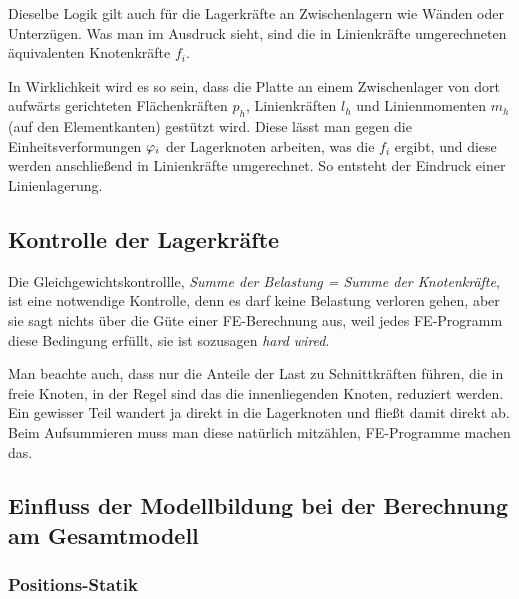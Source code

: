 Dieselbe Logik gilt auch f\"{u}r die Lagerkr\"{a}fte an Zwischenlagern wie W\"{a}nden oder Unterz\"{u}gen. Was man im Ausdruck sieht, sind die in Linienkr\"{a}fte umgerechneten \"{a}quivalenten Knotenkr\"{a}fte $f_i$.

In Wirklichkeit wird es so sein, dass die Platte an einem Zwischenlager von dort aufw\"{a}rts gerichteten Fl\"{a}chenkr\"{a}ften $p_h$, Linienkr\"{a}ften $l_h$ und Linienmomenten $m_h$ (auf den Elementkanten) gest\"{u}tzt wird. Diese l\"{a}sst man gegen die Einheitsverformungen $\varphi_i $ der Lagerknoten arbeiten, was die $f_i$ ergibt, und diese werden
anschlie{\ss}end in Linienkr\"{a}fte umgerechnet. So entsteht der Eindruck einer Linienlagerung.

{\textcolor{sectionTitleBlue}{\subsection{Kontrolle der Lagerkr\"{a}fte}}}
Die Gleichgewichtskontrollle, {\em Summe der Belastung = Summe der Knotenkr\"{a}fte\/}, ist eine notwendige Kontrolle, denn es darf keine Belastung verloren gehen, aber sie sagt nichts \"{u}ber die G\"{u}te einer FE-Berechnung aus, weil jedes FE-Programm diese Bedingung erf\"{u}llt, sie ist sozusagen {\em hard wired\/}.

Man beachte auch, dass nur die Anteile der Last zu Schnittkr\"{a}ften f\"{u}hren, die in freie Knoten, in der Regel sind das die innenliegenden Knoten, reduziert werden. Ein gewisser Teil wandert ja direkt in die Lagerknoten und flie{\ss}t damit direkt ab. Beim Aufsummieren muss man diese nat\"{u}rlich mitz\"{a}hlen, FE-Programme machen das.


{\textcolor{sectionTitleBlue}{\section{Einfluss der Modellbildung bei der
Berechnung am Gesamtmodell}}}
\vspace{-0.3cm}
{\textcolor{sectionTitleBlue}{\subsubsection*{Positions-Statik}}}\label{Positionsstatik}

